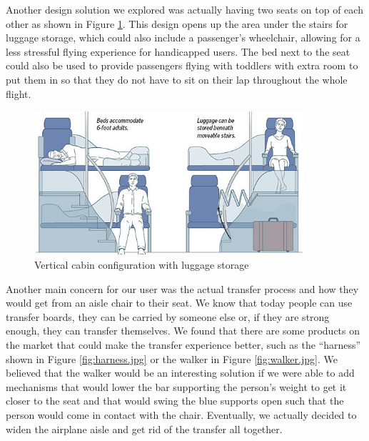 Another design solution we explored was actually having two seats on top of each other as shown in Figure \ref{fig:vertical_with_luggage.jpg}. This design opens up the area under the stairs for luggage storage, which could also include a passenger's wheelchair, allowing for a less stressful flying experience for handicapped users. The bed next to the seat could also be used to provide passengers flying with toddlers with extra room to put them in so that they do not have to sit on their lap throughout the whole flight. 

\begin{figure}[h]
  \centering
     \includegraphics[width=10cm]{images/vertical_with_luggage.jpg}
   \caption{Vertical cabin configuration with luggage storage \cite{vertical_luggage}}%
  \label{fig:vertical_with_luggage.jpg}
\end{figure} 

Another main concern for our user was the actual transfer process and how they would get from an aisle chair to their seat. We know that today people can use transfer boards, they can be carried by someone else or, if they are strong enough, they can transfer themselves. We found that there are some products on the market that could make the transfer experience better, such as the “harness” shown in Figure \ref{fig:harness.jpg} or the walker in Figure \ref{fig:walker.jpg}. We believed that the walker would be an interesting solution if we were able to add mechanisms  that would lower the bar supporting the person's weight to get it closer to the seat and that would swing the blue supports open such that the person would come in contact with the chair. Eventually, we actually decided to widen the airplane aisle and get rid of the transfer all together. 

